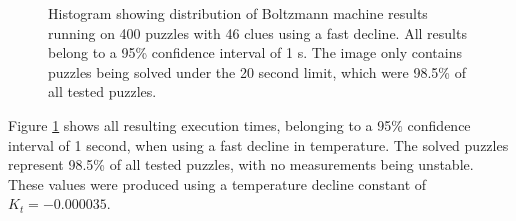 \documentclass[a4paper,11pt]{kth-mag}
\begin{document}
\begin{figure}[here] 
\noindent{}
\vspace{-15pt}
\caption{Histogram showing distribution of Boltzmann machine results running on 400 puzzles with 46 clues using a fast decline. All results belong to a 95\% confidence interval of 1 s. The image only contains puzzles being solved under the 20 second limit, which were 98.5\% of all tested puzzles.}
\label{fig:boltzmannFast}
\end{figure}

Figure \ref{fig:boltzmannFast} shows all resulting execution times, belonging to a 95\% confidence interval of 1 second, when using a fast decline in temperature.
The solved puzzles represent 98.5\% of all tested puzzles, with no measurements being unstable.
These values were produced using a temperature decline constant of $K_t = -0.000035$.
\end{document}
